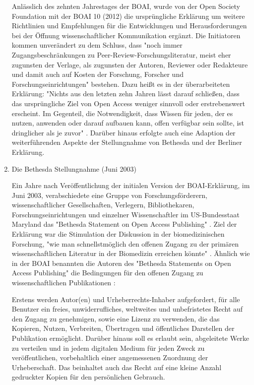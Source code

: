 \begin{enumerate}
Anlässlich des zehnten Jahrestages der BOAI, wurde von der Open Society Foundation mit der BOAI 10 (2012) die ursprüngliche Erklärung um weitere Richtlinien und Empfehlungen für die Entwicklungen und Herausforderungen bei der Öffnung wissenschaftlicher Kommunikation ergänzt. Die Initiatoren kommen unverändert zu dem Schluss, dass "noch immer Zugangsbeschränkungen zu Peer-Review-Forschungsliteratur, meist eher zugunsten der Verlage, als zugunsten der Autoren, Reviewer oder Redakteure und damit auch auf Kosten der Forschung, Forscher und Forschungseinrichtungen" \cite{boai_2012} bestehen. Dazu heißt es in der überarbeiteten Erklärung: "Nichts aus den letzten zehn Jahren lässt darauf schließen, dass das ursprüngliche Ziel von Open Access weniger sinnvoll oder erstrebenswert erscheint. Im Gegenteil, die Notwendigkeit, dass Wissen für jeden, der es nutzen, anwenden oder darauf aufbauen kann, offen verfügbar sein sollte, ist dringlicher als je zuvor" \cite{boai_2012}. Darüber hinaus erfolgte auch eine Adaption der weiterführenden Aspekte der Stellungnahme von Bethesda und der Berliner Erklärung.

\item Die Bethesda Stellungnahme (Juni 2003)

Ein Jahre nach Veröffentlichung der initialen Version der BOAI-Erklärung, im Juni 2003, verabschiedete eine Gruppe von Forschungsförderern, wissenschaftlicher Gesellschaften, Verlegern, Bibliothekaren, Forschungseinrichtungen und einzelner Wissenschaftler im US-Bundesstaat Maryland das "Bethesda Statement on Open Access Publishing" \cite{suber_2003_bethesda}. Ziel der Erklärung war die Stimulation der Diskussion in der biomedizinischen Forschung, "wie man schnellstmöglich den offenen Zugang zu der primären wissenschaftlichen Literatur in der Biomedizin erreichen könnte" \cite{suber_2003_bethesda}. Ähnlich wie in der BOAI benannten die Autoren des "Bethesda Statements on Open Access Publishing" die Bedingungen für den offenen Zugang zu wissenschaftlichen Publikationen \cite{suber_2003_bethesda}:

Erstens werden Autor(en) und Urheberrechts-Inhaber aufgefordert, für alle Benutzer ein freies, unwiderrufliches, weltweites und unbefristetes Recht auf den Zugang zu genehmigen, sowie eine Lizenz zu verwenden, die das Kopieren, Nutzen, Verbreiten, Übertragen und öffentliches Darstellen der Publikation ermöglicht. Darüber hinaus soll es erlaubt sein, abgeleitete Werke zu verteilen und in jedem digitalen Medium für jeden Zweck zu veröffentlichen, vorbehaltlich einer angemessenen Zuordnung der Urheberschaft. Das beinhaltet auch das Recht auf eine kleine Anzahl gedruckter Kopien für den persönlichen Gebrauch.


\end{enumerate}
